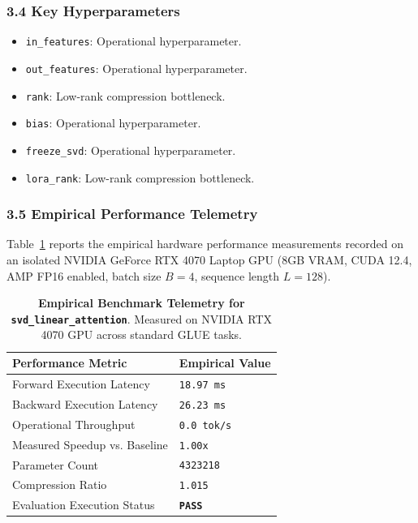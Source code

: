 \subsubsection*{3.4 Key Hyperparameters}
\begin{itemize}
    \item \texttt{in\_features}: Operational hyperparameter.
    \item \texttt{out\_features}: Operational hyperparameter.
    \item \texttt{rank}: Low-rank compression bottleneck.
    \item \texttt{bias}: Operational hyperparameter.
    \item \texttt{freeze\_svd}: Operational hyperparameter.
    \item \texttt{lora\_rank}: Low-rank compression bottleneck.
\end{itemize}

\subsubsection*{3.5 Empirical Performance Telemetry}
Table~\ref{tab:telemetry_svd\_linear\_attention} reports the empirical hardware performance measurements recorded on an isolated NVIDIA GeForce RTX 4070 Laptop GPU (8GB VRAM, CUDA 12.4, AMP FP16 enabled, batch size $B=4$, sequence length $L=128$).

\begin{table}[h]
\centering
\small
\caption{\textbf{Empirical Benchmark Telemetry for \texttt{svd\_linear\_attention}}. Measured on NVIDIA RTX 4070 GPU across standard GLUE tasks.}
\label{tab:telemetry_svd\_linear\_attention}
\begin{tabularx}{\columnwidth}{lX}
\toprule
\textbf{Performance Metric} & \textbf{Empirical Value} \\
\midrule
Forward Execution Latency & \texttt{18.97 ms} \\
Backward Execution Latency & \texttt{26.23 ms} \\
Operational Throughput & \texttt{0.0 tok/s} \\
Measured Speedup vs. Baseline & \texttt{1.00x} \\
Parameter Count & \texttt{4323218} \\
Compression Ratio & \texttt{1.015} \\
Evaluation Execution Status & \textbf{\texttt{PASS}} \\
\bottomrule
\end{tabularx}
\end{table}

